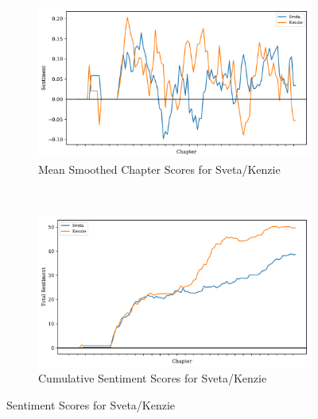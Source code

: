 \documentclass[11pt]{article}
\begin{document}
\begin{figure}[H]
\centering
\begin{subfigure}[t]{0.75\textwidth}
\centering
\includegraphics[width=\textwidth]{Fem Graphs v2/mean_smoothed_sent_scores.pdf}
\caption{Mean Smoothed Chapter Scores for Sveta/Kenzie}
\label{fem_mean}
\end{subfigure}
~
\begin{subfigure}[t]{0.75\textwidth}
\centering
\includegraphics[width=\textwidth]{Fem Graphs v2/total_sent_scores.pdf}
\caption{Cumulative Sentiment Scores for Sveta/Kenzie}
\label{fem_tot}
\end{subfigure}
\caption{Sentiment Scores for Sveta/Kenzie}
\label{fem_graphs}
\end{figure}
\end{document}
